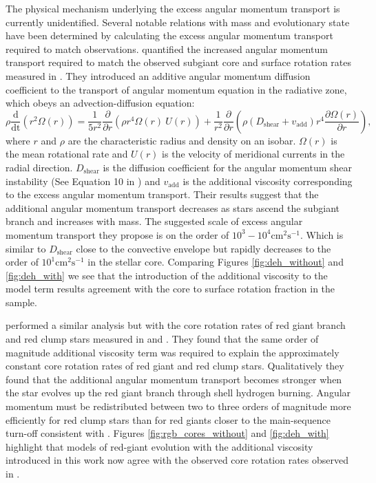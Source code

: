The physical mechanism underlying the excess angular momentum transport is currently unidentified.
Several notable relations with mass and evolutionary state have been determined by calculating the excess angular momentum transport required to match observations. 
\citet{spada_angular_2016} quantified the increased angular momentum transport required to match the observed subgiant core and surface rotation rates measured in \citet{deheuvels_seismic_2014}.
They introduced an additive angular momentum diffusion coefficient to the transport of angular momentum equation in the radiative zone, which obeys an advection-diffusion equation: 
\begin{equation}
    \rho \frac{\text{d}}{\text{dt}}\left(r^2 \Omega \left( r \right)\right) = \frac{1}{5r^2}\frac{\partial}{\partial r}\left(\rho r^4 \Omega \left( r \right)
 \ U\left(r\right)\right) + \frac{1}{r^2}\frac{\partial}{\partial r} \left(\rho \left( D_{\text{shear}} + v_{\text{add}}\right) r^4 \frac{\partial \Omega\left( r \right)}{\partial r}\right),
\end{equation}
\citep{zahn_circulation_1992,maeder_stellar_1998,eggenberger_geneva_2008}
where $r$ and $\rho$ are the characteristic radius and density on an isobar. $\Omega(r)$ is the mean rotational rate and $U(r)$ is the velocity of meridional currents in the radial direction. $D_{\text{shear}}$ is the diffusion coefficient for the angular momentum shear instability (See Equation 10 in \citet{eggenberger_effects_2010}) and $v_{\text{add}}$ is the additional viscosity corresponding to the excess angular momentum transport.
Their results suggest that the additional angular momentum transport decreases as stars ascend the subgiant branch and increases with mass.
The suggested scale of excess angular momentum transport they propose is on the order of $10^3-10^4 \text{cm}^2 \text{s}^{-1}$.
Which is similar to $D_{\text{shear}}$ close to the convective envelope but rapidly decreases to the order of $10^1\text{cm}^2 \text{s}^{-1}$ in the stellar core.
Comparing Figures \ref{fig:deh_without} and \ref{fig:deh_with} we see that the introduction of the additional viscosity to the model term results agreement with the core to surface rotation fraction in the \citet{deheuvels_seismic_2014} sample.

\citet{moyano_asteroseismology_2022} performed a similar analysis but with the core rotation rates of red giant branch and red clump stars measured in \citep{mosser_spin_2012} and \citet{gehan_core_2018}.
They found that the same order of magnitude additional viscosity term was required to explain the approximately constant core rotation rates of red giant and red clump stars.  
Qualitatively they found that the additional angular momentum transport becomes stronger when the star evolves up the red giant branch through shell hydrogen burning.
Angular momentum must be redistributed between two to three orders of
magnitude more efficiently for red clump stars than for red giants closer to the main-sequence turn-off consistent with \citet{den_hartogh_constraining_2019}.
Figures \ref{fig:rgb_cores_without} and \ref{fig:deh_with} highlight that models of red-giant evolution with the additional viscosity introduced in this work now agree with the observed core rotation rates observed in \citet{gehan_core_2018}.

